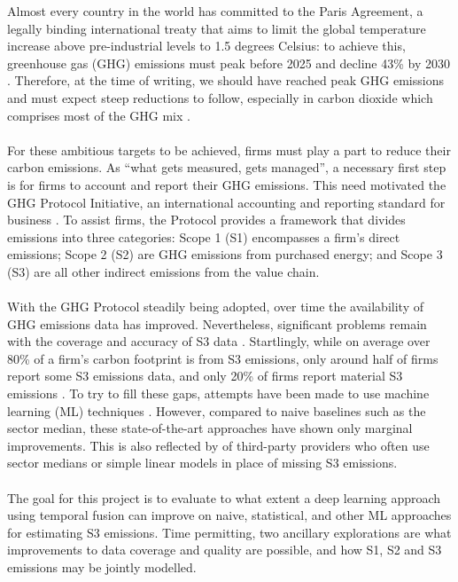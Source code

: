 \documentclass[12pt,twoside]{report}
\begin{document}
Almost every country in the world has committed to the Paris Agreement, a legally binding international treaty that aims to limit the global temperature increase above pre-industrial levels to 1.5 degrees Celsius: to achieve this, greenhouse gas (GHG) emissions must peak before 2025 and decline 43\% by 2030 \cite{unfcc2024}. Therefore, at the time of writing, we should have reached peak GHG emissions and must expect steep reductions to follow, especially in carbon dioxide which comprises most of the GHG mix \cite{Ritchie2023}. 
\\\\
For these ambitious targets to be achieved, firms must play a part to reduce their carbon emissions. As ``what gets measured, gets managed'', a necessary first step is for firms to account and report their GHG emissions. This need motivated the GHG Protocol Initiative, an international accounting and reporting standard for business \cite{ghgprotocol2004}. To assist firms, the Protocol provides a framework that divides emissions into three categories: Scope 1 (S1) encompasses a firm's direct emissions; Scope 2 (S2) are GHG emissions from purchased energy; and Scope 3 (S3) are all other indirect emissions from the value chain. 
\\\\
With the GHG Protocol steadily being adopted, over time the availability of GHG emissions data has improved. Nevertheless, significant problems remain with the coverage and accuracy of S3 data \cite{Papadopoulos2022}. Startlingly, while on average over 80\% of a firm's carbon footprint is from S3 emissions, only around half of firms report some S3 emissions data, and only 20\% of firms report material S3 emissions \cite{ftserussell2024}. To try to fill these gaps, attempts have been made to use machine learning (ML) techniques \cite{nguyen2021, Nguyenetal2023}. However, compared to naive baselines such as the sector median, these state-of-the-art approaches have shown only marginal improvements. This is also reflected by of third-party providers who often use sector medians or simple linear models in place of missing S3 emissions. 
\\\\
The goal for this project is to evaluate to what extent a deep learning approach using temporal fusion can improve on naive, statistical, and other ML approaches for estimating S3 emissions. Time permitting, two ancillary explorations are what improvements to data coverage and quality are possible, and how S1, S2 and S3 emissions may be jointly modelled.
\end{document}
